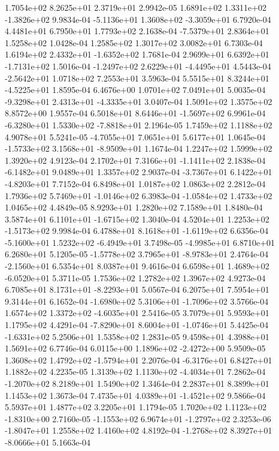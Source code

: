 1.7054e+02 8.2625e+01 2.3719e+01  2.9942e-05
 1.6891e+02  1.3311e+02 -1.3826e+02  9.9834e-04
-5.1136e+01  1.3608e+02 -3.3059e+01  6.7920e-04
4.4481e+01 6.7950e+01 1.7793e+02  2.1638e-04
-7.5379e+01  2.8364e+01  1.5258e+02  1.0428e-04
1.2585e+02 1.3017e+02 3.0082e+01  6.7303e-04
 1.6194e+02  2.4332e+01 -1.6352e+02  1.7681e-04
 2.9699e+01  6.6392e+01 -1.7131e+02  1.5016e-04
-1.2497e+02  2.6229e+01 -4.4495e+01  4.5443e-04
-2.5642e+01  1.0718e+02  7.2553e+01  3.5963e-04
 5.5515e+01  8.3244e+01 -4.5225e+01  1.8595e-04
6.4676e+00 1.0701e+02 7.0491e+01  5.0035e-04
-9.3298e+01  2.4313e+01 -4.3335e+01  3.0407e-04
1.5091e+02 1.3575e+02 8.8572e+00  1.9557e-04
 6.5018e+01  8.6446e+01 -1.5697e+02  6.9961e-04
-6.3280e+01  1.5330e+02 -7.8818e+01  2.1964e-05
1.7459e+02 1.1188e+02 4.9078e+01  5.5241e-05
-4.7055e+01  7.0651e+01  5.6177e+01  1.0645e-04
-1.5733e+02  3.1568e+01 -8.9509e+01  1.1674e-04
1.2247e+02 1.5999e+02 1.3920e+02  4.9123e-04
 2.1702e+01  7.3166e+01 -1.1411e+02  2.1838e-04
-6.1482e+01  9.0489e+01  1.3357e+02  2.9037e-04
-3.7367e+01  6.1422e+01 -4.8203e+01  7.7152e-04
6.8498e+01 1.0187e+02 1.0863e+02  2.2812e-04
 1.7936e+02  5.7469e+01 -1.0146e+02  6.3983e-04
-1.0584e+02  1.4733e+02  1.0465e+02  4.4849e-05
8.9293e+01 1.2820e+02 7.1589e+01  1.8480e-04
 3.5874e+01  6.1101e+01 -1.6715e+02  1.3040e-04
 4.5204e+01  1.2253e+02 -1.5173e+02  9.9984e-04
 6.4788e+01  8.1618e+01 -1.6119e+02  6.6356e-04
-5.1600e+01  1.5232e+02 -6.4949e+01  3.7498e-05
-4.9985e+01  6.8710e+01  6.2680e+01  5.1205e-05
-1.5778e+02  3.7965e+01 -8.9783e+01  2.4764e-04
-2.1560e+01  6.5354e+01  8.0387e+01  9.4616e-04
 6.6598e+01  1.4689e+02 -6.0520e+01  5.3711e-05
1.7536e+02 1.2782e+02 1.3967e+02  4.9273e-04
 6.7085e+01  8.1731e+01 -8.2293e+01  5.0567e-04
6.2075e+01 7.5954e+01 9.3144e+01  6.1652e-04
-1.6980e+02  5.3106e+01 -1.7096e+02  3.5766e-04
 1.6574e+02  1.3372e+02 -4.6035e+01  2.5416e-05
3.7079e+01 5.9593e+01 1.1795e+02  4.4291e-04
-7.8290e+01  8.6004e+01 -1.0746e+01  5.4425e-04
-1.6331e+02  5.2506e+01  1.5358e+02  1.2831e-05
9.4598e+01 4.3988e+01 1.5691e+02  6.7746e-04
 6.0115e+00  1.1896e+02 -2.4272e+00  5.9509e-05
 1.3608e+02  1.4792e+02 -1.5794e+01  2.2076e-04
-6.3176e+01  6.8427e+01  1.1882e+02  4.2235e-05
 1.3139e+02  1.1130e+02 -4.4034e+01  7.2862e-04
-1.2070e+02  8.2189e+01  1.5490e+02  1.3464e-04
2.2837e+01 8.3899e+01 1.1453e+02  1.3673e-04
 7.4735e+01  4.0389e+01 -1.4521e+02  9.5866e-04
5.5937e+01 1.4877e+02 3.2205e+01  1.1794e-05
 1.7020e+02  1.1123e+02 -1.8310e+00  2.7160e-05
-1.1553e+02  6.9674e+01 -1.2797e+02  2.3253e-06
-1.8047e+01  1.2558e+02  1.4160e+02  4.8192e-04
-1.2768e+02  8.3927e+01 -8.0666e+01  5.1663e-04
